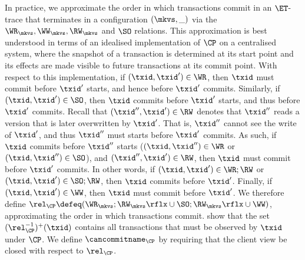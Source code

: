 In practice, we approximate the order in which transactions 
commit in an \(\ET\)-trace that terminates in a configuration \((\mkvs, \_)\) via the \(\WR_{\mkvs}, \WW_{\mkvs}, \RW_{\mkvs}\) and \(\SO\)  relations. 
This approximation is best understood in terms of an idealised implementation of \(\CP\) on a centralised system,
where the snapshot of a transaction is determined at its start point and its effects are made visible to future transactions at its commit point.
With respect to this implementation, if \((\txid,\txid') \in \WR\), then 
\(\txid\) must commit before \(\txid'\) starts, and hence before \(\txid'\) commits.
Similarly, if \((\txid,\txid') \in \SO\), then \(\txid\) commits before \(\txid'\) starts, 
and thus before \(\txid'\) commits.
% 
Recall that \((\txid'', \txid') \in \RW\)
denotes that \(\txid''\) reads a version that is later overwritten by \(\txid'\).
That is, \(\txid''\) cannot see the write of \(\txid'\), and thus \(\txid''\) must starts before 
\(\txid'\) commits. 
As such, if \(\txid\) commits before \(\txid''\) starts 
(\((\txid, \txid'') \in \WR\) or \((\txid,\txid'') \in \SO\)), 
and \((\txid'', \txid') \in \RW\), then \(\txid\) must commit before 
\(\txid'\) commits. 
In other words, if \((\txid,\txid') \in \WR;\RW\) or \((\txid,\txid') \in \SO;\RW\), then \(\txid\) commits before \(\txid'\).
Finally, if \((\txid,\txid') \in\WW\), then \(\txid\) must commit before \(\txid'\). 
We therefore define \(\rel_{\CP} \defeq (\WR_{\mkvs}; \RW_{\mkvs}\rflx \cup \SO;  \RW_{\mkvs}\rflx \cup \WW)\), approximating the order in which transactions commit. 
%
\citet{laws} show that the set \((\rel_{\CP}^{-1})^{+}(\txid)\) contains all transactions that must be observed by \(\txid\) under \(\CP\). 
We define \(\cancommitname_{\CP}\) by requiring that the client view be 
closed with respect to \(\rel_{\CP}\).


